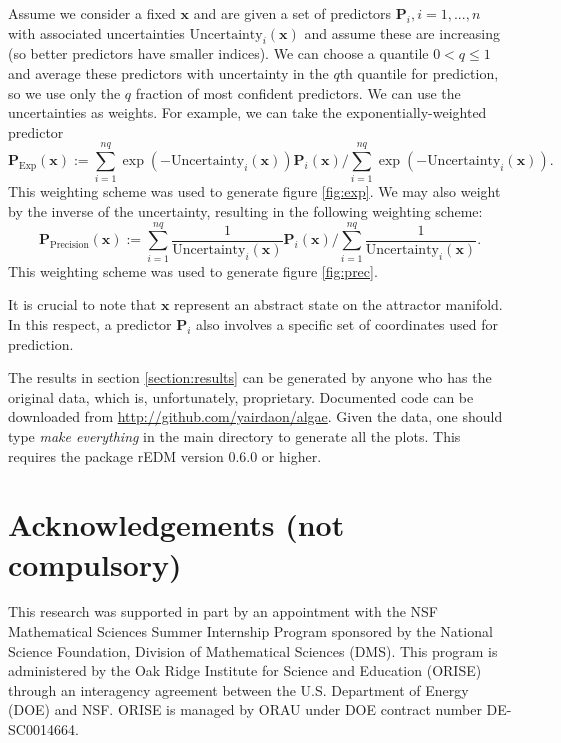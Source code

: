 \documentclass[fleqn,10pt]{wlscirep}
\newcommand{\un}{\text{Uncertainty}}
\newcommand{\x}{\mathbf{x}}
\newcommand{\pred}{\mathbf{P}}
\begin{document}
Assume we consider a fixed $\x$ and are given a set of predictors
$\pred_i, i =1,...,n$ with associated uncertainties $\un_i(\x)$ and
assume these are increasing (so better predictors have smaller
indices). We can choose a quantile $0 < q \leq 1$ and average these
predictors with uncertainty in the $q$th quantile for prediction, so
we use only the $q$ fraction of most confident predictors. We can use
the uncertainties as weights. For example, we can take the
exponentially-weighted predictor
\begin{equation*}
  \pred_{\text{Exp}} (\x ) := \sum_{i=1}^{nq} \exp(-\un_i(\x)) \pred_i(\x) / \sum_{i=1}^{nq} \exp(-\un_i(\x)).
\end{equation*}
 This weighting scheme was used to generate figure \ref{fig:exp}. We
 may also weight by the inverse of the uncertainty, resulting in the
 following weighting scheme:
\begin{equation*}
  \pred_{\text{Precision}} (\x ) := \sum_{i=1}^{nq} \frac{1}{\un_i(\x)} \pred_i(\x) / \sum_{i=1}^{nq} \frac{1}{\un_i(\x)}.
\end{equation*}
This weighting scheme was used to generate figure \ref{fig:prec}.

It is crucial to note that $\x$ represent an abstract state on the
attractor manifold. In this respect, a predictor $\pred_i$ also
involves a specific set of coordinates used for prediction.

The results in section \ref{section:results} can be generated by
anyone who has the original data, which is, unfortunately,
proprietary. Documented code can be downloaded from
\url{http://github.com/yairdaon/algae}. Given the data, one should
type \emph{make everything} in the main directory to generate all the
plots. This requires the package rEDM version 0.6.0 or higher.



\section*{Acknowledgements (not compulsory)}
This research was supported in part by an appointment with the NSF
Mathematical Sciences Summer Internship Program sponsored by the
National Science Foundation, Division of Mathematical Sciences
(DMS). This program is administered by the Oak Ridge Institute for
Science and Education (ORISE) through an interagency agreement between
the U.S. Department of Energy (DOE) and NSF. ORISE is managed by ORAU
under DOE contract number DE-SC0014664.
\end{document}

